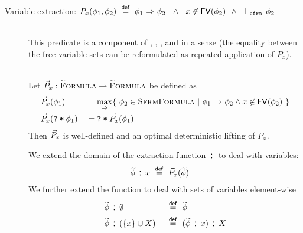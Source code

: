 \begin{description}
    \item[Variable extraction: $P_x(\phi_1, \phi_2) ~\overset{\textup{\textmd{\textsf{def}}}}{=}~ {\phi_1} \,\,{\Rightarrow}\,\, {\phi_2} ~~\wedge~~ x \not \in \textup{\textmd{\textsf{FV}}}(\phi_2) ~~\wedge~~ \vdash_\texttt{sfrm}\, \phi_2$]~\\
    This predicate is a component of , , ,  and in a sense  (the equality between the free variable sets can be reformulated as repeated application of $P_x$).
    \begin{lemma}~\\
        Let $\vec{P}_x : \textup{\textsc{\ensuremath{\widetilde{\text{F}}}ormula}} \rightharpoonup \textup{\textsc{\ensuremath{\widetilde{\text{F}}}ormula}}$ be defined as
        \begin{alignat*}{2}
        & \vec{P}_x(\phi_1)          & &= \underset{{} \,\,{\Rightarrow}\,\, {}}{\max} \{~ \phi_2 \in \textup{\textsc{SfrmFormula}} ~|~ {\phi_1} \,\,{\Rightarrow}\,\, {\phi_2} \wedge x \not \in \textup{\textmd{\textsf{FV}}}(\phi_2) ~\} \\
        & \vec{P}_x(\textup{\texttt{\textup{\texttt{?}}\:*\:\ensuremath{\phi_1}}}) & &= \textup{\texttt{\textup{\texttt{?}}\:*\:\ensuremath{\vec{P}_x(\phi_1)}}}
        \end{alignat*}
        Then $\vec{P}_x$ is well-defined and an optimal deterministic lifting of $P_x$.
    \end{lemma}
    We extend the domain of the extraction function $\div$ to deal with variables:
    \begin{alignat*}{2}
        & \widetilde{\phi}\div x ~\overset{\textup{\textmd{\textsf{def}}}}{=}~ \vec{P}_x(\widetilde{\phi}) & ~
    \end{alignat*}
    We further extend the function to deal with sets of variables element-wise
    \begin{alignat*}{2}
    	 & \widetilde{\phi}\div\emptyset        & & ~\overset{\textup{\textmd{\textsf{def}}}}{=}~ \widetilde{\phi}                   \\
    	 & \widetilde{\phi}\div(\{ x \} \cup X) & & ~\overset{\textup{\textmd{\textsf{def}}}}{=}~ (\widetilde{\phi}\div x)\div X
    \end{alignat*}
\end{description}